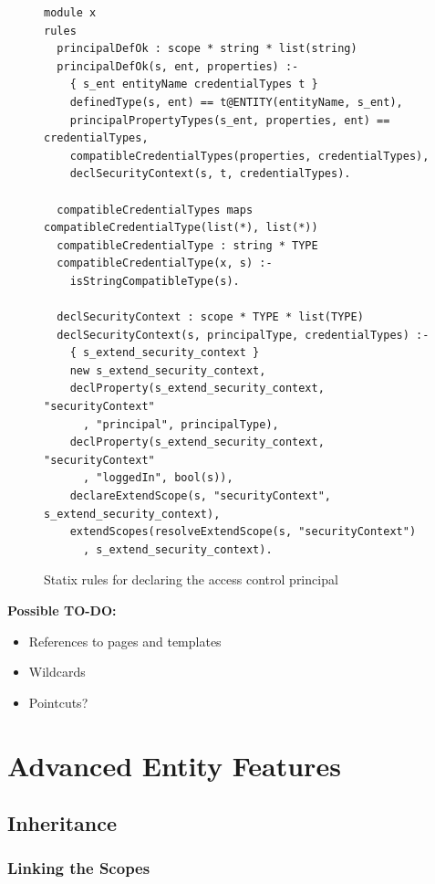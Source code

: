       \begin{figure}
        \begin{verbatim}
module x
rules
  principalDefOk : scope * string * list(string)
  principalDefOk(s, ent, properties) :-
    { s_ent entityName credentialTypes t }
    definedType(s, ent) == t@ENTITY(entityName, s_ent),
    principalPropertyTypes(s_ent, properties, ent) == credentialTypes,
    compatibleCredentialTypes(properties, credentialTypes),
    declSecurityContext(s, t, credentialTypes).

  compatibleCredentialTypes maps compatibleCredentialType(list(*), list(*))
  compatibleCredentialType : string * TYPE
  compatibleCredentialType(x, s) :-
    isStringCompatibleType(s).

  declSecurityContext : scope * TYPE * list(TYPE)
  declSecurityContext(s, principalType, credentialTypes) :-
    { s_extend_security_context }
    new s_extend_security_context,
    declProperty(s_extend_security_context, "securityContext"
      , "principal", principalType),
    declProperty(s_extend_security_context, "securityContext"
      , "loggedIn", bool(s)),
    declareExtendScope(s, "securityContext", s_extend_security_context),
    extendScopes(resolveExtendScope(s, "securityContext")
      , s_extend_security_context).
        \end{verbatim}
        \caption{\label{fig:webdsl-principal-statix}Statix rules for declaring the access control principal}
      \end{figure}

      \textbf{Possible TO-DO:}
      \begin{itemize}
        \item References to pages and templates
        \item Wildcards
        \item Pointcuts?
      \end{itemize}

  \section{\label{sec:advanced-entity-features}Advanced Entity Features}
  
    \subsection{\label{subsec:inheritance}Inheritance}

      \subsubsection{Linking the Scopes}

